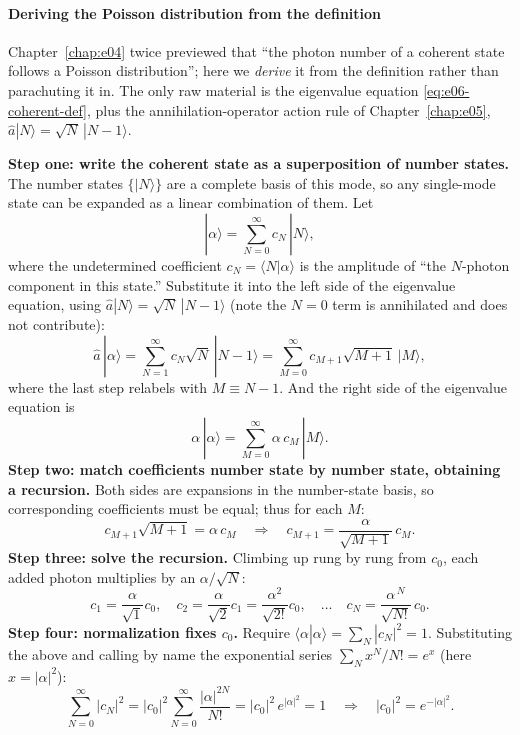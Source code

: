 \paragraph{Deriving the Poisson distribution from the definition}
\label{sec:e06-coherent-poisson}

Chapter~\ref{chap:e04} twice previewed that ``the photon number of a coherent state follows a Poisson distribution''; here we \emph{derive} it from the definition rather than parachuting it in. The only raw material is the eigenvalue equation \eqref{eq:e06-coherent-def}, plus the annihilation-operator action rule of Chapter~\ref{chap:e05}, \(\hat a|N\rangle=\sqrt{N}\,|N-1\rangle\).

\textbf{Step one: write the coherent state as a superposition of number states.} The number states \(\{|N\rangle\}\) are a complete basis of this mode, so any single-mode state can be expanded as a linear combination of them. Let
\[
  |\alpha\rangle=\sum_{N=0}^{\infty}c_N\,|N\rangle,
\]
where the undetermined coefficient \(c_N=\langle N|\alpha\rangle\) is the amplitude of ``the \(N\)-photon component in this state.'' Substitute it into the left side of the eigenvalue equation, using \(\hat a|N\rangle=\sqrt{N}\,|N-1\rangle\) (note the \(N=0\) term is annihilated and does not contribute):
\[
  \hat a\,|\alpha\rangle
  =\sum_{N=1}^{\infty}c_N\sqrt{N}\,|N-1\rangle
  =\sum_{M=0}^{\infty}c_{M+1}\sqrt{M+1}\,|M\rangle,
\]
where the last step relabels with \(M\equiv N-1\). And the right side of the eigenvalue equation is
\[
  \alpha\,|\alpha\rangle=\sum_{M=0}^{\infty}\alpha\,c_M\,|M\rangle.
\]
\textbf{Step two: match coefficients number state by number state, obtaining a recursion.} Both sides are expansions in the number-state basis, so corresponding coefficients must be equal; thus for each \(M\):
\[
  c_{M+1}\sqrt{M+1}=\alpha\,c_M
  \quad\Longrightarrow\quad
  c_{M+1}=\frac{\alpha}{\sqrt{M+1}}\,c_M .
\]
\textbf{Step three: solve the recursion.} Climbing up rung by rung from \(c_0\), each added photon multiplies by an \(\alpha/\sqrt{N}\):
\[
  c_1=\frac{\alpha}{\sqrt1}c_0,\quad
  c_2=\frac{\alpha}{\sqrt2}c_1=\frac{\alpha^2}{\sqrt{2!}}c_0,\quad\dots\quad
  c_N=\frac{\alpha^{\,N}}{\sqrt{N!}}\,c_0 .
\]
\textbf{Step four: normalization fixes \(c_0\).} Require \(\langle\alpha|\alpha\rangle=\sum_N|c_N|^2=1\). Substituting the above and calling by name the exponential series \(\sum_{N}x^N/N!=e^{x}\) (here \(x=|\alpha|^2\)):
\[
  \sum_{N=0}^{\infty}|c_N|^2
  =|c_0|^2\sum_{N=0}^{\infty}\frac{|\alpha|^{2N}}{N!}
  =|c_0|^2\,e^{|\alpha|^2}=1
  \quad\Longrightarrow\quad
  |c_0|^2=e^{-|\alpha|^2}.
\]

